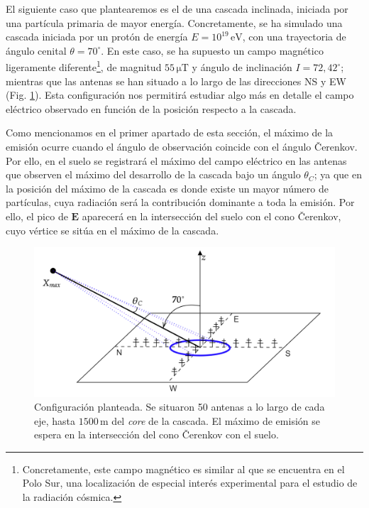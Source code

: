 \documentclass[12 pt, a4paper]{article} %
\numberwithin{equation}{section}
\numberwithin{figure}{section}
\numberwithin{table}{section}
\newcommand{\vect}[1]{\boldsymbol{\mathbf{#1}}}
\begin{document}
El siguiente caso que plantearemos es el de una cascada inclinada, iniciada por una partícula primaria de mayor energía. Concretamente, se ha simulado una cascada iniciada por un protón de energía $E=10^{19}\,\mathrm{eV}$, con una trayectoria de ángulo cenital $\theta=70^{\circ}$. En este caso, se ha supuesto un campo magnético ligeramente diferente\footnote{ Concretamente, este campo magnético es similar al que se encuentra en el Polo Sur, una localización de especial interés experimental para el estudio de la radiación cósmica.}, de magnitud $55\,\mathrm{\mu T}$ y ángulo de inclinación $I = 72,42^\circ$; mientras que las antenas se han situado a lo largo de las direcciones NS y EW (Fig. \ref{ANITApaper_showscheme}). Esta configuración nos permitirá estudiar algo más en detalle el campo eléctrico observado en función de la posición respecto a la cascada.

Como mencionamos en el primer apartado de esta sección, el máximo de la emisión ocurre cuando el ángulo de observación coincide con el ángulo \v{C}erenkov. Por ello, en el suelo se registrará el máximo del campo eléctrico en las antenas que observen el máximo del desarrollo de la cascada bajo un ángulo $\theta_C$; ya que en la posición del máximo de la cascada es donde existe un mayor número de partículas, cuya radiación será la contribución dominante a toda la emisión. Por ello, el pico de $\vect{E}$ aparecerá en la intersección del suelo con el cono \v{C}erenkov, cuyo vértice se sitúa en el máximo de la cascada. 
\begin{figure}[H]
	\centering
	\includegraphics[width=.5\linewidth]{figures/radio/ANITApaper_showscheme}
	\caption{Configuración planteada. Se situaron 50 antenas a lo largo de cada eje, hasta $1500\,\mathrm{m}$ del \textit{core} de la cascada. El máximo de emisión se espera en la intersección del cono \v{C}erenkov con el suelo.}
	\label{ANITApaper_showscheme}
\end{figure}
\end{document}
